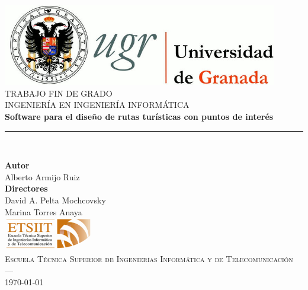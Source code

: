 \begin{titlepage}
\newlength{\centeroffset}
\setlength{\centeroffset}{-0.5\oddsidemargin}
\addtolength{\centeroffset}{0.5\evensidemargin}
\thispagestyle{empty}

\noindent\hspace*{\centeroffset}\begin{minipage}{\textwidth}

\centering
\includegraphics[width=0.9\textwidth]{imagenes/logo_ugr.jpg}\\[1.4cm]

\textsc{ \Large TRABAJO FIN DE GRADO\\[0.2cm]}
\textsc{ INGENIERÍA EN INGENIERÍA INFORMÁTICA}\\[1cm]
% 
{\Huge\bfseries Software para el diseño de rutas turísticas con 
	puntos de interés\\
}
\noindent\rule[-1ex]{\textwidth}{3pt}\\[3.5ex]
{\large\bfseries }
\end{minipage}

\vspace{1cm}
\noindent\hspace*{\centeroffset}\begin{minipage}{\textwidth}
\centering

\textbf{Autor}\\ {Alberto Armijo Ruiz}\\[2.5ex]
\textbf{Directores}\\
{David A. Pelta Mochcovsky\\
 Marina Torres Anaya}\\[2cm]
\includegraphics[width=0.3\textwidth]{imagenes/etsiit_logo.png}\\[0.1cm]
\textsc{Escuela Técnica Superior de Ingenierías Informática y de Telecomunicación}\\
\textsc{---}\\
\today
\end{minipage}
\end{titlepage}


